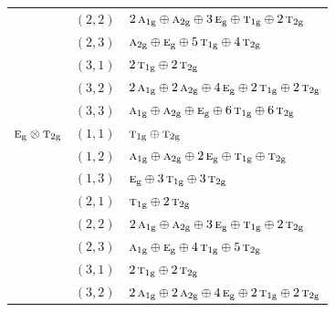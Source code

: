 \documentclass[11pt]{article}
\newcommand{\irr}[1]{\text{\normalfont\scshape #1}}
\newcommand{\ptag}[1]{\mathrm{#1}}
\begin{document}
\begin{longtable}{p{} c p{}}
 & $(2,2)$ & $2\,\irr{a}_{1\ptag{g}}\oplus \irr{a}_{2\ptag{g}}\oplus 3\,\irr{e}_{\ptag{g}}\oplus \irr{t}_{1\ptag{g}}\oplus 2\,\irr{t}_{2\ptag{g}}$\\

 & $(2,3)$ & $\irr{a}_{2\ptag{g}}\oplus \irr{e}_{\ptag{g}}\oplus 5\,\irr{t}_{1\ptag{g}}\oplus 4\,\irr{t}_{2\ptag{g}}$\\

 & $(3,1)$ & $2\,\irr{t}_{1\ptag{g}}\oplus 2\,\irr{t}_{2\ptag{g}}$\\

 & $(3,2)$ & $2\,\irr{a}_{1\ptag{g}}\oplus 2\,\irr{a}_{2\ptag{g}}\oplus 4\,\irr{e}_{\ptag{g}}\oplus 2\,\irr{t}_{1\ptag{g}}\oplus 2\,\irr{t}_{2\ptag{g}}$\\

 & $(3,3)$ & $\irr{a}_{1\ptag{g}}\oplus \irr{a}_{2\ptag{g}}\oplus \irr{e}_{\ptag{g}}\oplus 6\,\irr{t}_{1\ptag{g}}\oplus 6\,\irr{t}_{2\ptag{g}}$\\

\hline

$\irr{e}_{\ptag{g}}\otimes \irr{t}_{2\ptag{g}}$ & $(1,1)$ & $\irr{t}_{1\ptag{g}}\oplus \irr{t}_{2\ptag{g}}$\\

 & $(1,2)$ & $\irr{a}_{1\ptag{g}}\oplus \irr{a}_{2\ptag{g}}\oplus 2\,\irr{e}_{\ptag{g}}\oplus \irr{t}_{1\ptag{g}}\oplus \irr{t}_{2\ptag{g}}$\\

 & $(1,3)$ & $\irr{e}_{\ptag{g}}\oplus 3\,\irr{t}_{1\ptag{g}}\oplus 3\,\irr{t}_{2\ptag{g}}$\\

 & $(2,1)$ & $\irr{t}_{1\ptag{g}}\oplus 2\,\irr{t}_{2\ptag{g}}$\\

 & $(2,2)$ & $2\,\irr{a}_{1\ptag{g}}\oplus \irr{a}_{2\ptag{g}}\oplus 3\,\irr{e}_{\ptag{g}}\oplus \irr{t}_{1\ptag{g}}\oplus 2\,\irr{t}_{2\ptag{g}}$\\

 & $(2,3)$ & $\irr{a}_{1\ptag{g}}\oplus \irr{e}_{\ptag{g}}\oplus 4\,\irr{t}_{1\ptag{g}}\oplus 5\,\irr{t}_{2\ptag{g}}$\\

 & $(3,1)$ & $2\,\irr{t}_{1\ptag{g}}\oplus 2\,\irr{t}_{2\ptag{g}}$\\

 & $(3,2)$ & $2\,\irr{a}_{1\ptag{g}}\oplus 2\,\irr{a}_{2\ptag{g}}\oplus 4\,\irr{e}_{\ptag{g}}\oplus 2\,\irr{t}_{1\ptag{g}}\oplus 2\,\irr{t}_{2\ptag{g}}$\\


\end{longtable}
\end{document}
